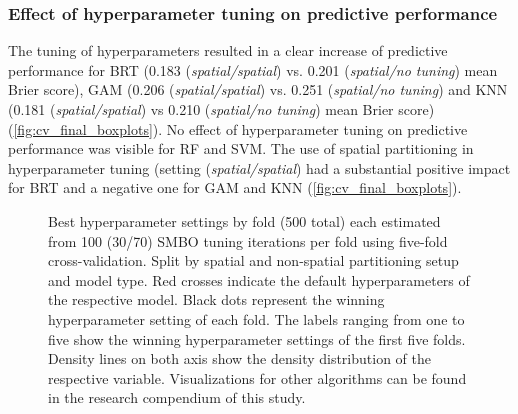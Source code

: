 \documentclass[review]{elsarticle}
\begin{document}
\subsubsection{Effect of hyperparameter tuning on predictive performance}
The tuning of hyperparameters resulted in a clear increase of predictive performance for BRT (0.183 (\emph{spatial/spatial}) vs. 0.201 (\emph{spatial/no tuning}) mean Brier score), GAM (0.206 (\emph{spatial/spatial}) vs. 0.251 (\emph{spatial/no tuning}) and KNN (0.181 (\emph{spatial/spatial}) vs 0.210 (\emph{spatial/no tuning}) mean Brier score) (\autoref{fig:cv_final_boxplots}).
No effect of hyperparameter tuning on predictive performance was visible for RF and SVM.
The use of spatial partitioning in hyperparameter tuning (setting (\emph{spatial/spatial}) had a substantial positive impact for BRT and a negative one for GAM and KNN (\autoref{fig:cv_final_boxplots}).

\begin{figure} [H]
	\begin{center}
		\caption[]{Best hyperparameter settings by fold (500 total) each estimated from 100 (30/70) SMBO tuning iterations per fold using five-fold cross-validation.
		Split by spatial and non-spatial partitioning setup and model type.
			Red crosses indicate the default hyperparameters of the respective model.
			Black dots represent the winning hyperparameter setting of each fold.
			The labels ranging from one to five show the winning hyperparameter settings of the first five folds.
			Density lines on both axis show the density distribution of the respective variable.
			Visualizations for other algorithms can be found in the research compendium of this study.}
		\label{fig:best_parameter_combs}
	\end{center}
\end{figure}
\end{document}
